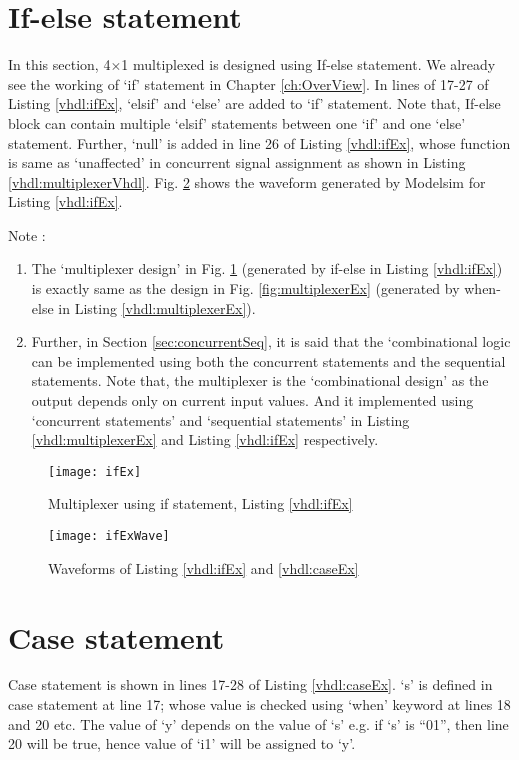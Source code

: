 \section{If-else statement}
In this section, 4$\times$1 multiplexed is designed using If-else statement. We already see the working of `if' statement in Chapter \ref{ch:OverView}. In lines of 17-27 of Listing \ref{vhdl:ifEx}, `elsif' and `else' are added to `if' statement. Note that, If-else block can contain multiple `elsif' statements between one `if' and one `else' statement. Further, `null' is added in line 26 of Listing \ref{vhdl:ifEx}, whose function is same as `unaffected' in concurrent signal assignment as shown in Listing \ref{vhdl:multiplexerVhdl}. Fig. \ref{fig:ifExWave} shows the waveform generated by Modelsim for Listing \ref{vhdl:ifEx}. 

\begin{noNumBox}
	Note : 
	\begin{enumerate}
		\item The `multiplexer design' in Fig. \ref{fig:ifEx} (generated by if-else in Listing \ref{vhdl:ifEx}) is exactly same as the design in Fig. \ref{fig:multiplexerEx} (generated by when-else in Listing \ref{vhdl:multiplexerEx}).  
		
		\item Further, in Section \ref{sec:concurrentSeq}, it is said that the `combinational logic can be implemented using both the concurrent statements and the sequential statements. Note that, the multiplexer is the `combinational design' as the output depends only on current input values. And it implemented using `concurrent statements' and `sequential statements' in Listing \ref{vhdl:multiplexerEx} and Listing \ref{vhdl:ifEx} respectively. 
	\end{enumerate}
\end{noNumBox}

\begin{figure}
	\centering
	\texttt{[image: ifEx]}
	\caption{Multiplexer using if statement, Listing \ref{vhdl:ifEx}}
	\label{fig:ifEx}
\end{figure}
\begin{figure}
	\centering
	\texttt{[image: ifExWave]}
	\caption{Waveforms of Listing \ref{vhdl:ifEx} and \ref{vhdl:caseEx}}
	\label{fig:ifExWave}
\end{figure}


\section{Case statement}
Case statement is shown in lines 17-28 of Listing \ref{vhdl:caseEx}. `s' is defined in case statement at line 17; whose value is checked using `when' keyword at lines 18 and 20 etc. The value of `y' depends on the value of `s' e.g. if `s' is ``01'', then line 20 will be true, hence value of `i1' will be assigned to `y'. 

